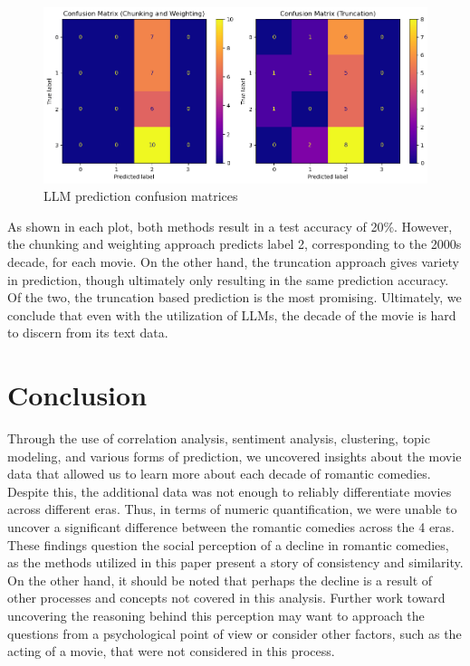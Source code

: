 \documentclass[
  authoryear,
  preprint]{elsarticle}
\begin{document}
\begin{figure}[H]

{\centering \includegraphics{images/trunc_llm-imageonline.co-merged.png}

}

\caption{LLM prediction confusion matrices}

\end{figure}%

As shown in each plot, both methods result in a test accuracy of 20\%.
However, the chunking and weighting approach predicts label 2,
corresponding to the 2000s decade, for each movie. On the other hand,
the truncation approach gives variety in prediction, though ultimately
only resulting in the same prediction accuracy. Of the two, the
truncation based prediction is the most promising. Ultimately, we
conclude that even with the utilization of LLMs, the decade of the movie
is hard to discern from its text data.

\section{Conclusion}\label{conclusion}

Through the use of correlation analysis, sentiment analysis, clustering,
topic modeling, and various forms of prediction, we uncovered insights
about the movie data that allowed us to learn more about each decade of
romantic comedies. Despite this, the additional data was not enough to
reliably differentiate movies across different eras. Thus, in terms of
numeric quantification, we were unable to uncover a significant
difference between the romantic comedies across the 4 eras. These
findings question the social perception of a decline in romantic
comedies, as the methods utilized in this paper present a story of
consistency and similarity. On the other hand, it should be noted that
perhaps the decline is a result of other processes and concepts not
covered in this analysis. Further work toward uncovering the reasoning
behind this perception may want to approach the questions from a
psychological point of view or consider other factors, such as the
acting of a movie, that were not considered in this process.


\renewcommand\refname{References}
  
\end{document}
